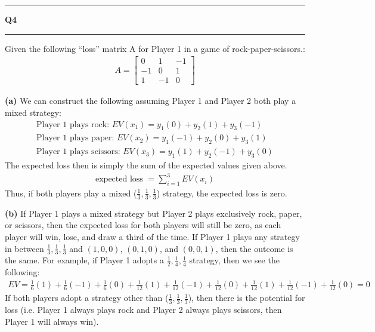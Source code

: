 \documentclass[11pt]{article}
\newcommand\question[2]{\vspace{.25in}\hrule\textbf{#1 #2}\vspace{.5em}\hrule\vspace{.10in}}
\renewcommand\part[1]{\vspace{.10in}\textbf{(#1)}}
\begin{document}
\newpage
\question{Q4}{}
Given the following ``loss'' matrix A for Player 1 in a game of rock-paper-scissors.:
\begin{align*}
A = 
\begin{bmatrix}
0 & 1 & -1 \\
-1 & 0 & 1 \\
1 & -1 & 0
\end{bmatrix}
\end{align*}

\part{a}
We can construct the following assuming Player 1 and Player 2 both play a mixed strategy:
\begin{align*}
\text{Player 1 plays rock: } EV(x_1) = y_1(0) + y_2(1) + y_3(-1) \\
\text{Player 1 plays paper: } EV(x_2) = y_1(-1) + y_2(0) + y_3(1) \\
\text{Player 1 plays scissors: } EV(x_3) = y_1(1) + y_2(-1) + y_3(0)
\end{align*}
The expected loss then is simply the sum of the expected values given above.
\begin{align*}
\text{expected loss } = \sum_{i=1}^3EV(x_i)
\end{align*}
Thus, if both players play a mixed ($\frac{1}{3},\frac{1}{3},\frac{1}{3}$) strategy, the expected loss is zero.

\part{b}
If Player 1 plays a mixed strategy but Player 2 plays exclusively rock, paper, or scissors, then the expected loss for both players will still be zero, as each player will win, lose, and draw a third of the time. If Player 1 plays any strategy in between $\frac{1}{3},\frac{1}{3},\frac{1}{3}$ and $(1, 0, 0)$, $(0, 1, 0)$, and $(0, 0, 1)$, then the outcome is the same. For example, if Player 1 adopts a $\frac{1}{2},\frac{1}{4},\frac{1}{4}$ strategy, then we see the following:
\begin{align*}
EV = \frac{1}{6}(1) + \frac{1}{6}(-1) + \frac{1}{6}(0) + \frac{1}{12}(1) + \frac{1}{12}(-1) + \frac{1}{12}(0) + \frac{1}{12}(1) + \frac{1}{12}(-1) + \frac{1}{12}(0) = 0
\end{align*}
If both players adopt a strategy other than ($\frac{1}{3},\frac{1}{3},\frac{1}{3}$), then there is the potential for loss (i.e. Player 1 always plays rock and Player 2 always plays scissors, then Player 1 will always win).
\end{document}
